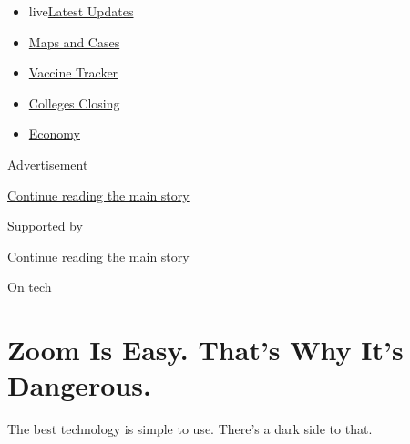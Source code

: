 \begin{itemize}
\tightlist
\item
  live\href{https://www.nytimes3xbfgragh.onion/2020/08/21/world/covid-19-coronavirus.html?name=styln-coronavirus-markets\&region=TOP_BANNER\&variant=undefined\&block=storyline_menu_recirc\&action=click\&pgtype=Article\&impression_id=a068cf30-e39f-11ea-9027-41a96f0fd4e9}{Latest
  Updates}
\item
  \href{https://www.nytimes3xbfgragh.onion/interactive/2020/us/coronavirus-us-cases.html?name=styln-coronavirus-markets\&region=TOP_BANNER\&variant=undefined\&block=storyline_menu_recirc\&action=click\&pgtype=Article\&impression_id=a068cf31-e39f-11ea-9027-41a96f0fd4e9}{Maps
  and Cases}
\item
  \href{https://www.nytimes3xbfgragh.onion/interactive/2020/science/coronavirus-vaccine-tracker.html?name=styln-coronavirus-markets\&region=TOP_BANNER\&variant=undefined\&block=storyline_menu_recirc\&action=click\&pgtype=Article\&impression_id=a068cf32-e39f-11ea-9027-41a96f0fd4e9}{Vaccine
  Tracker}
\item
  \href{https://www.nytimes3xbfgragh.onion/2020/08/19/us/colleges-closing-covid.html?name=styln-coronavirus-markets\&region=TOP_BANNER\&variant=undefined\&block=storyline_menu_recirc\&action=click\&pgtype=Article\&impression_id=a068cf33-e39f-11ea-9027-41a96f0fd4e9}{Colleges
  Closing}
\item
  \href{https://www.nytimes3xbfgragh.onion/live/2020/08/20/business/stock-market-today-coronavirus?name=styln-coronavirus-markets\&region=TOP_BANNER\&variant=undefined\&block=storyline_menu_recirc\&action=click\&pgtype=Article\&impression_id=a068cf34-e39f-11ea-9027-41a96f0fd4e9}{Economy}
\end{itemize}

Advertisement

\protect\hyperlink{after-top}{Continue reading the main story}

Supported by

\protect\hyperlink{after-sponsor}{Continue reading the main story}

On tech

\hypertarget{zoom-is-easy-thats-why-its-dangerous}{%
\section{Zoom Is Easy. That's Why It's
Dangerous.}\label{zoom-is-easy-thats-why-its-dangerous}}

The best technology is simple to use. There's a dark side to that.

